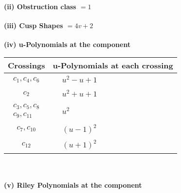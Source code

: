 \documentclass[1p]{elsarticle_modified}
\theoremstyle{definition}
\begin{document}
\flushleft \textbf{(ii) Obstruction class $= 1$}\\~\\
\flushleft \textbf{(iii) Cusp Shapes $= 4 v+2$}\\~\\
\newpage\renewcommand{\arraystretch}{1}
\flushleft \textbf{(iv) u-Polynomials at the component}\newline \\
\begin{tabular}{m{50pt}|m{274pt}}
Crossings & \hspace{64pt}u-Polynomials at each crossing \\
\hline $$\begin{aligned}c_{1},c_{4},c_{6}\end{aligned}$$&$\begin{aligned}
&u^2- u+1
\end{aligned}$\\
\hline $$\begin{aligned}c_{2}\end{aligned}$$&$\begin{aligned}
&u^2+u+1
\end{aligned}$\\
\hline $$\begin{aligned}c_{3},c_{5},c_{8}\\c_{9},c_{11}\end{aligned}$$&$\begin{aligned}
&u^2
\end{aligned}$\\
\hline $$\begin{aligned}c_{7},c_{10}\end{aligned}$$&$\begin{aligned}
&(u-1)^2
\end{aligned}$\\
\hline $$\begin{aligned}c_{12}\end{aligned}$$&$\begin{aligned}
&(u+1)^2
\end{aligned}$\\
\hline
\end{tabular}\\~\\
\newpage\renewcommand{\arraystretch}{1}
\flushleft \textbf{(v) Riley Polynomials at the component}\newline \\
\end{document}
